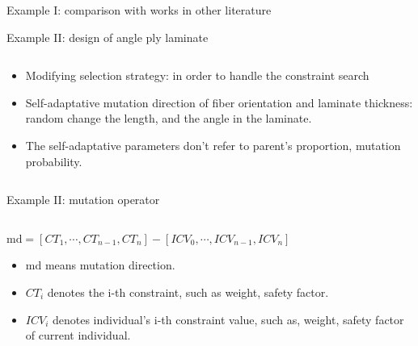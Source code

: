 \documentclass{beamer}
\begin{document}
\begin{frame}{Example I: comparison with works in other literature}
	
\end{frame}


\begin{frame}{Example II: design of angle ply laminate}
    \begin{columns}[c]
    \begin{column}{1\textwidth}
		\begin{itemize}
			\item Modifying selection strategy: in order to handle the constraint search
			\item Self-adaptative mutation direction of fiber orientation and laminate thickness:
				random change the length, and the angle in the laminate.
			\item The self-adaptative parameters don't refer to parent's proportion, mutation
				probability.
		\end{itemize}
    \end{column}
\end{columns}
\end{frame}


\begin{frame}{Example II: mutation operator}
    \begin{columns}[c]
    \begin{column}{1\textwidth}
		$\text{md} = [CT_1, \cdots, CT_{n-1}, CT_n] -  [ICV_0, \cdots, ICV_{n-1},
		ICV_n]$ \\
		\begin{itemize}
			\item  md means mutation direction.
			\item  $CT_i$ denotes the i-th constraint, such as weight, safety factor.
			\item  $ICV_i$ denotes individual's i-th constraint value, such as,  weight, safety
				factor of current individual.
		\end{itemize}

    \end{column}
\end{columns}
\end{frame}
\end{document}
